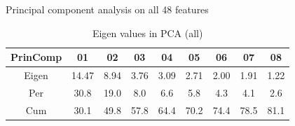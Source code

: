 \begin{table}[h!]
	\centering
	\caption{Eigen values in PCA (all)}
	{\small Principal component analysis on all 48 features}
	\bigskip
	\label{tab:eigen-values-all}
	\begin{tabular}{|c|c|c|c|c|c|c|c|c|}
		\hline
		\textbf{PrinComp} & \textbf{01} & \textbf{02} & \textbf{03} & \textbf{04} & \textbf{05} & \textbf{06} & \textbf{07} & \textbf{08} \\
		\hline
		Eigen & 14.47 & 8.94 & 3.76 & 3.09 & 2.71 & 2.00 & 1.91 & 1.22 \\
		Per & 30.8 & 19.0 & 8.0 & 6.6 & 5.8 & 4.3 & 4.1 & 2.6 \\
		Cum & 30.1 & 49.8 & 57.8 & 64.4 & 70.2 & 74.4 & 78.5 & 81.1 \\
		\hline
	\end{tabular}
\end{table}

